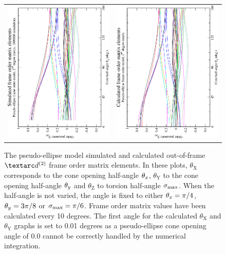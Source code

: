 \begin{figure}
\begin{tabular}{@{}cc@{}}
    \\[-5pt]
    \includegraphics[width=.35\textwidth,angle=270]{images/frame_order_matrix/Sijkl_pseudo-ellipse_out_of_frame_theta_z_ens1000000.eps} &
    \includegraphics[width=.35\textwidth,angle=270]{images/frame_order_matrix/Sijkl_pseudo-ellipse_out_of_frame_theta_z_calc.eps} \\
  \end{tabular}
  \caption[Pseudo-ellipse simulated and calculated out-of-frame $\FOtwo$ elements.]{
    The pseudo-ellipse model simulated and calculated out-of-frame $\FOtwo$ frame order matrix elements.
    In these plots, $\theta_\textrm{X}$ corresponds to the cone opening half-angle $\theta_x$, $\theta_\textrm{Y}$ to the cone opening half-angle $\theta_y$ and $\theta_\textrm{Z}$ to torsion half-angle $\sigma_\textrm{max}$.
    When the half-angle is not varied, the angle is fixed to either $\theta_x = \pi/4$, $\theta_y = 3\pi/8$ or $\sigma_\textrm{max} = \pi/6$.
    Frame order matrix values have been calculated every 10 degrees.
    The first angle for the calculated $\theta_\textrm{X}$ and $\theta_\textrm{Y}$ graphs is set to 0.01 degrees as a pseudo-ellipse cone opening angle of 0.0 cannot be correctly handled by the numerical integration.
  }
  \label{fig: simulated and calculated out-of-frame 2nd degree pseudo-ellipse frame order}
\end{figure}



